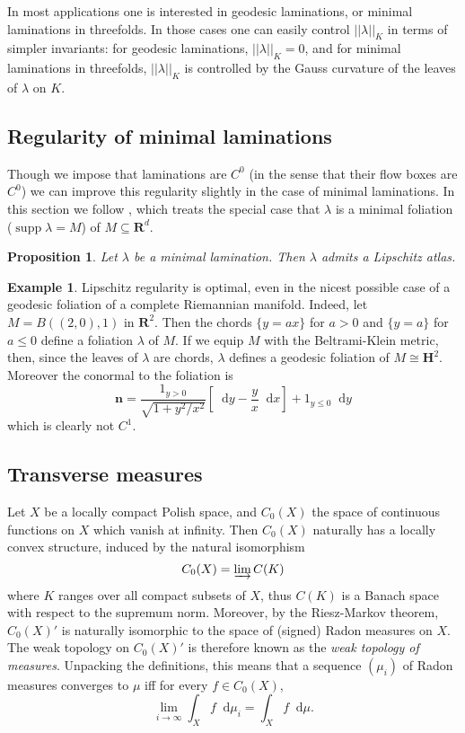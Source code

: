 \documentclass[reqno,10pt]{amsart}
\newcommand{\RR}{\mathbf{R}}
\newcommand{\Hyp}{\mathbf H}
\newcommand*\dif{\mathop{}\!\mathrm{d}}
\DeclareMathOperator{\supp}{supp}
\newcommand{\normal}{\mathbf n}
\newcommand{\dfn}[1]{\emph{#1}\index{#1}}
\newtheorem{proposition}[theorem]{Proposition}
\theoremstyle{definition}
\newtheorem{example}[theorem]{Example}
\numberwithin{equation}{section}
\begin{document}
In most applications one is interested in geodesic laminations, or minimal laminations in threefolds.
In those cases one can easily control $||\lambda||_K$ in terms of simpler invariants: for geodesic laminations, $||\lambda||_K = 0$, and for minimal laminations in threefolds, $||\lambda||_K$ is controlled by the Gauss curvature of the leaves of $\lambda$ on $K$.


\subsection{Regularity of minimal laminations}
Though we impose that laminations are $C^0$ (in the sense that their flow boxes are $C^0$) we can improve this regularity slightly in the case of minimal laminations.
In this section we follow \cite{Solomon86}, which treats the special case that $\lambda$ is a minimal foliation ($\supp \lambda = M$) of $M \subseteq \RR^d$.

\begin{proposition}
Let $\lambda$ be a minimal lamination. Then $\lambda$ admits a Lipschitz atlas.
\end{proposition}

\begin{example}
Lipschitz regularity is optimal, even in the nicest possible case of a geodesic foliation of a complete Riemannian manifold.
Indeed, let $M = B((2, 0), 1)$ in $\RR^2$. Then the chords $\{y = ax\}$ for $a > 0$ and $\{y = a\}$ for $a \leq 0$ define a foliation $\lambda$ of $M$.
If we equip $M$ with the Beltrami-Klein metric, then, since the leaves of $\lambda$ are chords, $\lambda$ defines a geodesic foliation of $M \cong \Hyp^2$.
Moreover the conormal to the foliation is
$$\normal = \frac{1_{y > 0}}{\sqrt{1 + y^2/x^2}} \left[\dif y - \frac{y}{x} \dif x\right] + 1_{y \leq 0} \dif y$$
which is clearly not $C^1$.
\end{example}

\subsection{Transverse measures}
Let $X$ be a locally compact Polish space, and $C_0(X)$ the space of continuous functions on $X$ which vanish at infinity.
Then $C_0(X)$ naturally has a locally convex structure, induced by the natural isomorphism
$$C_0(X) = \varinjlim C(K)$$
where $K$ ranges over all compact subsets of $X$, thus $C(K)$ is a Banach space with respect to the supremum norm.
Moreover, by the Riesz-Markov theorem, $C_0(X)'$ is naturally isomorphic to the space of (signed) Radon measures on $X$.
The weak topology on $C_0(X)'$ is therefore known as the \dfn{weak topology of measures}.
Unpacking the definitions, this means that a sequence $(\mu_i)$ of Radon measures converges to $\mu$ iff for every $f \in C_0(X)$,
$$\lim_{i \to \infty} \int_X f \dif \mu_i = \int_X f \dif \mu.$$
\end{document}
